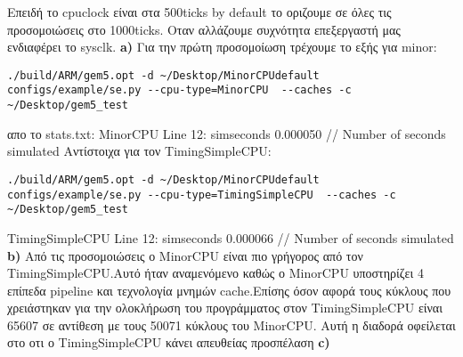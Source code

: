 \documentclass[10pt]{report}
\newcommand{\tu}{\textunderscore}
\begin{document}
\newline
Επειδή το cpu\tu clock είναι στα 500ticks by default το οριζουμε σε όλες τις προσομοιώσεις στο 1000ticks. Οταν αλλάζουμε συχνότητα επεξεργαστή μας ενδιαφέρει το sys\tu clk.\newline
\textbf{a)}\newline
Για την πρώτη προσομοίωση τρέχουμε το εξής για minor:\newline
\newline
\begin{lstlisting}
./build/ARM/gem5.opt -d ~/Desktop/MinorCPUdefault configs/example/se.py --cpu-type=MinorCPU  --caches -c ~/Desktop/gem5_test
\end{lstlisting}\newline
απο το stats.txt:\newline
MinorCPU\newline
Line 12:	sim\tu seconds	0.000050	// Number of seconds simulated\newline
Αντίστοιχα για τον TimingSimpleCPU:
\begin{lstlisting}
./build/ARM/gem5.opt -d ~/Desktop/MinorCPUdefault configs/example/se.py --cpu-type=TimingSimpleCPU  --caches -c ~/Desktop/gem5_test
\end{lstlisting}\newline
TimingSimpleCPU\newline
Line 12:	sim\tu seconds  0.000066	// Number of seconds simulated\newline
\textbf{b)}\newline
Από τις προσομοιώσεις ο MinorCPU είναι πιο γρήγορος από τον TimingSimpleCPU.Αυτό ήταν αναμενόμενο καθώς ο MinorCPU υποστηρίζει 4 επίπεδα pipeline και τεχνολογία  μνημών cache.Επίσης όσον αφορά τους κύκλους που χρειάστηκαν για την ολοκλήρωση του προγράμματος στον TimingSimpleCPU είναι 65607 σε αντίθεση με τους 50071 κύκλους του MinorCPU. Αυτή η διαδορά οφείλεται στο οτι ο TimingSimpleCPU κάνει απευθείας προσπέλαση\newline
\textbf{c)}\newline
\end{document}
